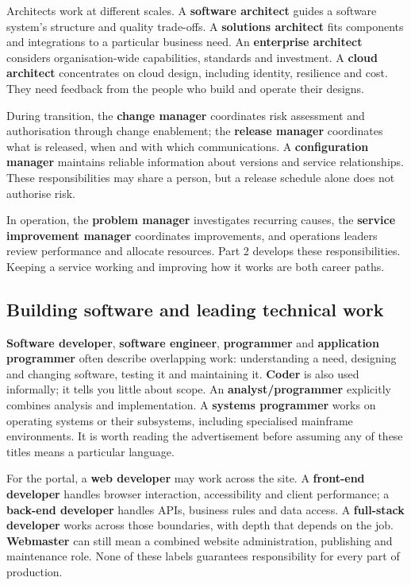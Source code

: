 Architects work at different scales. A \textbf{software architect} guides a software system's structure and quality trade-offs. A \textbf{solutions architect} fits components and integrations to a particular business need. An \textbf{enterprise architect} considers organisation-wide capabilities, standards and investment. A \textbf{cloud architect} concentrates on cloud design, including identity, resilience and cost. They need feedback from the people who build and operate their designs.


During transition, the \textbf{change manager} coordinates risk assessment and authorisation through change enablement; the \textbf{release manager} coordinates what is released, when and with which communications. A \textbf{configuration manager} maintains reliable information about versions and service relationships. These responsibilities may share a person, but a release schedule alone does not authorise risk.


In operation, the \textbf{problem manager} investigates recurring causes, the \textbf{service improvement manager} coordinates improvements, and operations leaders review performance and allocate resources. Part 2 develops these responsibilities. Keeping a service working and improving how it works are both career paths.



\subsection{Building software and leading technical work}


\textbf{Software developer}, \textbf{software engineer}, \textbf{programmer} and \textbf{application programmer} often describe overlapping work: understanding a need, designing and changing software, testing it and maintaining it. \textbf{Coder} is also used informally; it tells you little about scope. An \textbf{analyst/programmer} explicitly combines analysis and implementation. A \textbf{systems programmer} works on operating systems or their subsystems, including specialised mainframe environments. It is worth reading the advertisement before assuming any of these titles means a particular language.


For the portal, a \textbf{web developer} may work across the site. A \textbf{front-end developer} handles browser interaction, accessibility and client performance; a \textbf{back-end developer} handles APIs, business rules and data access. A \textbf{full-stack developer} works across those boundaries, with depth that depends on the job. \textbf{Webmaster} can still mean a combined website administration, publishing and maintenance role. None of these labels guarantees responsibility for every part of production.


